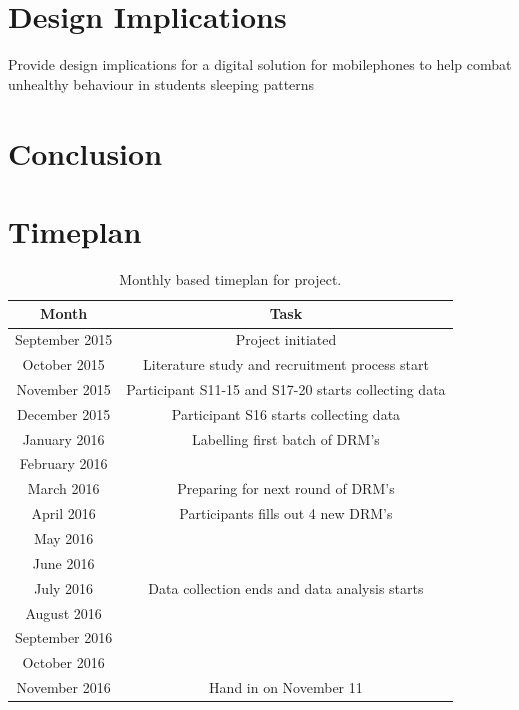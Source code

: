\documentclass[12pt]{article} %
\begin{document}
\section{Design Implications}
Provide design implications for a digital solution for mobilephones to help combat unhealthy behaviour in students sleeping patterns

\section{Conclusion}


\newpage
{}

%



\newpage
\appendix
\section{Timeplan} \label{sec:experiment1}
\begin{table}[H]
\center
\begin{footnotesize}
	\begin{tabular}{| c | c |}
	\hline
	\textbf{Month} & \textbf{Task} \\
	\hline
	September 2015 & Project initiated\\
	October 2015 & Literature study and recruitment process start\\
	November 2015 & Participant S11-15 and S17-20 starts collecting data\\
	December 2015 & Participant S16 starts collecting data\\
	January 2016 & Labelling first batch of DRM's \\
	February 2016 & \\
	March 2016 & Preparing for next round of DRM's \\
	April 2016 & Participants fills out 4 new DRM's\\
	May 2016 & \\
	June 2016 & \\
	July 2016 & Data collection ends and data analysis starts\\
	August 2016 & \\
	September 2016 & \\
	October 2016 & \\
	November 2016 & Hand in on November 11\\
	\hline
	\end{tabular}
	\caption{Monthly based timeplan for project.}
	\label{tab:timeplan}
\end{footnotesize}
\end{table}
\end{document}
